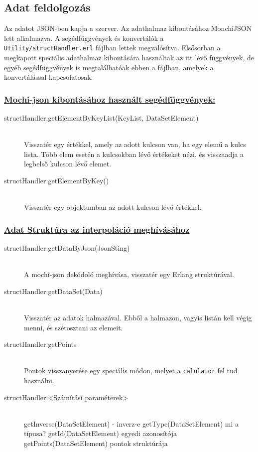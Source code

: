 \subsection{Adat feldolgozás}
	Az adatot JSON-ben kapja a szerver. Az adathalmaz kibontásához MonchiJSON lett alkalmazva. 
	A segédfüggvények és konvertálók a \texttt{Utility/structHandler.erl} fájlban lettek megvalósítva.\newline
	Elsősorban a megkapott speciális adathalmaz kibontására használtak az itt lévő függvények, de egyéb segédfüggvények is megtalálhatóak ebben a fájlban, amelyek a konvertálással kapcsolatosak.

	\subsubsection{\underline{
		Mochi-json kibontásához használt segédfüggvények:
	}}
	\begin{description}
		\item[structHandler:getElementByKeyList(KeyList, DataSetElement)] \hfill \\ 
		Visszatér egy értékkel, amely az adott kulcson van, ha egy elemű a kulcs lista. Több elem esetén a kulcsokban lévő értékeket nézi, és visszaadja a legbelső kulcson lévő elemet.

		\item[structHandler:getElementByKey()] \hfill \\ 
		Visszatér egy objektumban az adott kulcson lévő értékkel.
	\end{description}
	\subsubsection{\underline{Adat Struktúra az interpoláció meghívásához}}
	\begin{description}

		\item[structHandler:getDataByJson(JsonSting)] \hfill \\
		A mochi-json dekódoló meghívása, visszatér egy Erlang struktúrával.
		
		\item[structHandler:getDataSet(Data)]\hfill \\ 
		Visszatér az adatok halmazával. Ebből a halmazon, vagyis listán kell végig menni, és szétosztani az elemeit. 
		
		\item[structHandler:getPoints] \hfill \\
		Pontok visszanyerése egy speciális módon, melyet a \texttt{calulator} fel tud használni.

		

		\item[structHandler:<Számítási paraméterek>] \hfill \\ 
		getInverse(DataSetElement) - inverz-e \newline
		getType(DataSetElement) mi a típusa? \newline
		getId(DataSetElement) egyedi azonosítója \newline
		getPoints(DataSetElement) pontok struktúrája
	\end{description}
